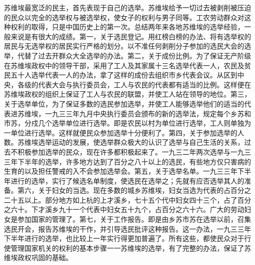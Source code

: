 苏维埃最宽泛的民主，首先表现于自己的选举。苏维埃给予一切过去被剥削被压迫的民众以完全的选举权与被选举权，使女子的权利与男子同等。工农劳动群众对这种权利的取得，只是中国历史上的第一次。总结两年来各地苏维埃的选举经验，一般来说是有很大的成绩。第一，关于选民登记。用红榜白榜的办法、将有选举权的居民与无选举权的居民实行严格的划分。以不准任何剥削分子参加的选民大会的选举，代替了过去开群众大全选举的办法。第二，关于成份比例。为了保证无产阶级在苏维埃政权中的领导干部，采用了工人及其家属十三名选举代表一人，农民及贫民五十人选举代表一人的办法，拿了这样的成份去组织市乡代表会议。从区到中央，各级的代表大会与执行委员会，工人与农民的代表都有适当的比例。这样便在苏维埃政权的组织上保证了工人与农民的联盟，并使工人站在领导的地位。第三，关于选举单位，为了保证多数的选民参加选举，并使工人能够选举他们的适当的代表进苏维埃，一九三三年九月中央执行委员会颁布的新的选举法，规定每个乡苏和市苏，分戍几个选举单位进行选举。即是农民以村为单位进行选举，工人则单独为一单位进行选举。这样就便民众参加选举十分便利了。第四，关于参加选举的人数。苏维埃选举运动的发展，使选举群众极大的认识了选举与自己生活的关系，过去不积极参加选举的民众，现在许多都积极起来了。一九三二年两次选举与一九三三年下半年的选举，许多地方达到了百分之八十以上的选民，有些地方仅只害病的生育的以及担任警戒的入不会参加选举会。第五，关于选举名单。一九三三年下半年进行的选举，实行了候选名单制度，使选民在选举之；先就有应否选举其人的准备。第六，关于妇女的当选。现在多数的城乡苏维埃，妇女当选为代表的占百分之二十五以上。部分地方如上杭的上才溪乡，七十五个代中妇女四十三个，占了百分之六十。下才溪乡九十一个代表中妇女五十九个，占百分之六十六。广大的劳动妇女是参加国家的管理了。第七，关于工作报告。即是由乡苏市苏在选举以前，召集选民开会，报告苏维埃的干作，并引导选民批评这种报告。这一办法，一九三三年下半年进行的选举，也比较上一年实行得更加普遍了。所有这些，都使民众对于行使管理国家机关的权利的基本步骤一一苏维埃的选举，有了完整的办法，保证了苏维埃政权巩固的基础。

